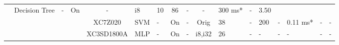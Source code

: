 \begin{table}
\begin{adjustbox}{totalheight=\baselineskip,}
\begin{tabular}{ccccclp{2em}cp{3em}cp{2em}p{4em}p{3em}p{3.5em}p{3.5em}p{2.5em}p{3em}}
                   &\multirow{1}{*}{Decision Tree}
                       &\multirow{1}{*}{-}
                           &\multirow{1}{*}{On}
                               &\multirow{1}{*}{-}
                                   &\multirow{1}{*}{i8}
                                       &\multirow{1}{*}{10}
                                           &\multirow{1}{*}{86}
                                               &\multirow{1}{*}{-}
                                                   &\multirow{1}{*}{-}
                                                       &\multirow{1}{*}{300 ms*}
                                                           &\multirow{1}{*}{-}
                                                               &\multirow{1}{*}{3.50}\\
\cmidrule{4-17}
   &   &   &\multirow{1}{*}{\cite{martinsRealtimeSVMbasedHardware2024}}
               &\multirow{1}{*}{XC7Z020}
                   &\multirow{1}{*}{SVM}
                       &\multirow{1}{*}{-}
                           &\multirow{1}{*}{On}
                               &\multirow{1}{*}{-}
                                   &\multirow{1}{*}{Orig}
                                       &\multirow{1}{*}{38}
                                           &\multirow{1}{*}{-}
                                               &\multirow{1}{*}{200}
                                                   &\multirow{1}{*}{-}
                                                       &\multirow{1}{*}{0.11 ms*}
                                                           &\multirow{1}{*}{-}
                                                               &\multirow{1}{*}{-}\\
\cmidrule{4-17}
   &   &   &\multirow{1}{*}{\cite{matos-carvalhoStaticDynamicAlgorithms2019}}
               &\multirow{1}{*}{XC3SD1800A}
                   &\multirow{1}{*}{MLP}
                       &\multirow{1}{*}{-}
                           &\multirow{1}{*}{On}
                               &\multirow{1}{*}{-}
                                   &\multirow{1}{*}{i8,i32}
                                       &\multirow{1}{*}{26}
                                           &\multirow{1}{*}{-}
                                               &\multirow{1}{*}{-}
                                                   &\multirow{1}{*}{-}
                                                       &\multirow{1}{*}{-}
                                                           &\multirow{1}{*}{-}
                                                               &\multirow{1}{*}{-}\\

\end{tabular}
\end{adjustbox}
\end{table}
